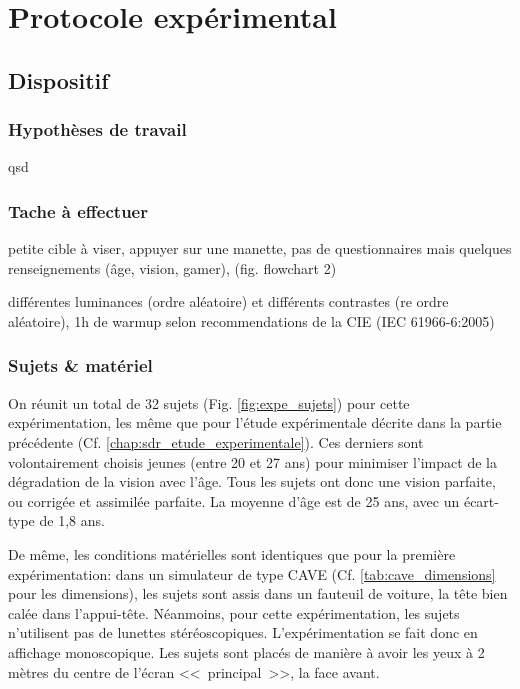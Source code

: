 \chapter{Protocole expérimental}
	\section{Dispositif}
	\subsection{Hypothèses de travail}
	\par qsd	
	
	\subsection{Tache à effectuer}	
	\par petite cible à viser, appuyer sur une manette, pas de questionnaires mais quelques renseignements (âge, vision, gamer), (fig. flowchart 2)
	
	\par différentes luminances (ordre aléatoire) et différents contrastes (re ordre aléatoire), 1h de warmup selon recommendations de la CIE (IEC 61966-6:2005)
	
	\subsection{Sujets \& matériel}
	\par On réunit un total de 32 sujets (Fig. \ref{fig:expe_sujets}) pour cette expérimentation, les même que pour l'étude expérimentale décrite dans la partie précédente (Cf.  \ref{chap:sdr_etude_experimentale}). Ces derniers sont volontairement choisis jeunes (entre 20 et 27 ans) pour minimiser l'impact de la dégradation de la vision avec l'âge. Tous les sujets ont donc une vision parfaite, ou corrigée et assimilée parfaite. La moyenne d'âge est de 25 ans, avec un écart-type de 1,8 ans.
	
	\par De même, les conditions matérielles sont identiques que pour la première expérimentation: dans un simulateur de type CAVE (Cf. \ref{tab:cave_dimensions} pour les dimensions), les sujets sont assis dans un fauteuil de voiture, la tête bien calée dans l'appui-tête. Néanmoins, pour cette expérimentation, les sujets n'utilisent pas de lunettes stéréoscopiques. L'expérimentation se fait donc en affichage monoscopique. Les sujets sont placés de manière à avoir les yeux à 2 mètres du centre de l'écran <<~principal~>>, la face avant.
	
